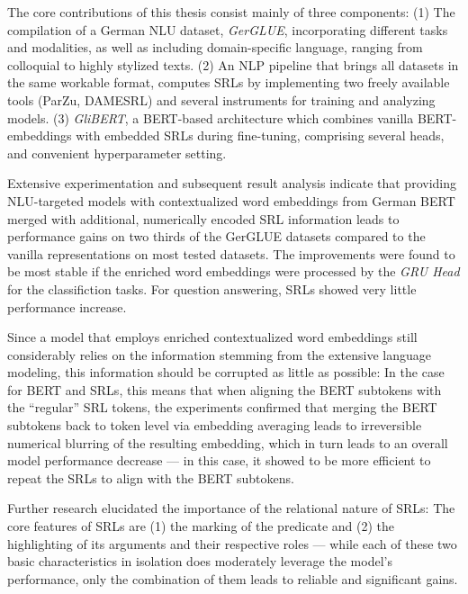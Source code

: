 \label{chap:6_conclusion}



The core contributions of this thesis consist mainly of three components: (1)
The compilation of a German NLU dataset, \emph{GerGLUE}, incorporating different
tasks and modalities, as well as including domain-specific language, ranging from
colloquial to highly stylized texts. (2) An NLP pipeline that brings all datasets in
the same workable format, computes SRLs by implementing two freely available tools
(ParZu, DAMESRL) and several instruments for training and analyzing models. (3)
\emph{GliBERT}, a BERT-based architecture which combines vanilla BERT-embeddings
with embedded SRLs during fine-tuning, comprising several heads, and convenient
hyperparameter setting.

Extensive experimentation and subsequent result analysis indicate that providing
NLU-targeted models with contextualized word embeddings from German BERT merged
with additional, numerically encoded SRL information leads to performance gains on
two thirds of the GerGLUE datasets compared to the vanilla representations on most
tested datasets. The improvements were found to be most stable if the enriched
word embeddings were processed by the \emph{GRU Head} for the classifiction tasks.
For question answering, SRLs showed very little performance increase.

Since a model that employs enriched contextualized word embeddings still considerably relies on the
information stemming from the extensive language modeling, this information should be corrupted as
little as possible: In the case for BERT and SRLs, this means that when aligning the BERT subtokens
with the ``regular'' SRL tokens, the experiments confirmed that merging the BERT subtokens back
to token level via embedding averaging leads to irreversible numerical blurring of the resulting
embedding, which in turn leads to an overall model performance decrease --- in this case, it showed
to be more efficient to repeat the SRLs to align with the BERT subtokens.

Further research elucidated the importance of the relational nature of SRLs: The core
features of SRLs are (1) the marking of the predicate and (2) the highlighting of its
arguments and their respective roles --- while each of these two basic characteristics
in isolation does moderately leverage the model's performance, only the combination of
them leads to reliable and significant gains.

